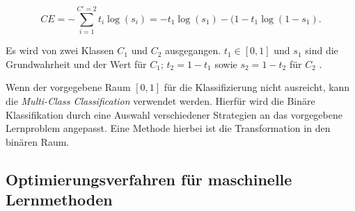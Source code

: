 \begin{equation}
	CE = - \sum_{i=1}^{C'=2}{t_i \log(s_i) = -t_1 \log(s_1) - (1-t_1} \log(1-s_1).
\end{equation}

Es wird von zwei Klassen $C_1$ und $C_2$ ausgegangen. $t_1 \in [0,1]$ und $s_1$ sind die Grundwahrheit und der Wert für $C_1$; $t_2 = 1 - t_1$ sowie $s_2 = 1 - t_2$ für $C_2$ \cite{rubinstein2014cross}.

Wenn der vorgegebene Raum $[0,1]$ für die Klassifizierung nicht ausreicht, kann die \emph{Multi-Class Classification} verwendet werden. Hierfür wird die Binäre Klassifikation durch eine Auswahl verschiedener Strategien an das vorgegebene Lernproblem angepasst. Eine Methode hierbei ist die Transformation in den binären Raum. 



\newpage
\subsection{Optimierungsverfahren für maschinelle Lernmethoden}\label{sec:optimize}


